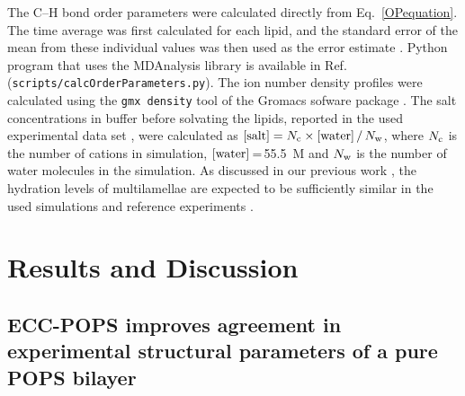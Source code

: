 \documentclass[journal=jpcbfk,manuscript=article]{achemso}
\begin{document}
The C--H bond order parameters were calculated directly from Eq.~\ref{OPequation}.
The time average was first calculated for each lipid, and
the standard error of the mean from these individual values was then used as the
error estimate \cite{botan15,ollila16,NMRlipidsIV}.
Python program that uses the
MDAnalysis library \cite{agrawal11,gowers16} is available in Ref.~ ({\tt scripts/calcOrderParameters.py}). 
The ion number density profiles were calculated using the {\tt gmx density} tool
of the Gromacs sofware package \cite{gromacsMANUAL}.
The salt concentrations in buffer before solvating the lipids, reported in the used experimental data set \cite{roux90},
were calculated as $[{\rm salt}]=N_{\rm c} \times[{\rm water}]\,/\,N_{\rm w}$,
where $N_{\rm c}$ is the number of cations in simulation, $[{\rm water}]$\,=\,55.5~M and $N_{\rm w}$
is the number of water molecules in the simulation.
As discussed in our previous work \cite{NMRlipidsIV}, the hydration levels of
multilamellae are expected to be sufficiently similar in the used simulations and reference experiments \cite{roux90}.


\section{Results and Discussion} 
 
\subsection{ECC-POPS improves agreement in experimental structural parameters of a pure POPS bilayer } 
 
\end{document}
